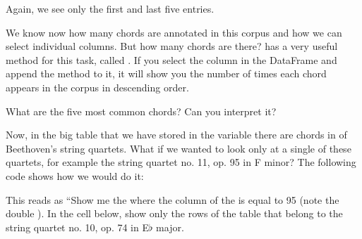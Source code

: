 \documentclass[letterpaper,10pt,english]{sphinxmanual}
\begin{document}
Again, we see only the first and last five entries.

We know now how many chords are annotated in this corpus and how we can select individual columns. But how many  chords are there?  has a very useful method for this task, called . If you select the  column in the DataFrame  and append the  method to it, it will show you the number of times each chord appears in the corpus in descending order.

{
\begin{sphinxVerbatim}[commandchars=\\\{\}]
\llap{\color{nbsphinxin}[ ]:\,\hspace{\fboxrule}\hspace{\fboxsep}}
\end{sphinxVerbatim}
}

What are the five most common chords? Can you interpret it?

Now, in the big table that we have stored in the variable  there are  chords in  of Beethoven’s string quartets. What if we wanted to look only at a single of these quartets, for example the string quartet no. 11, op. 95 in F minor? The following code shows how we would do it:

\begin{sphinxVerbatim}[commandchars=\\\{\}]
\PYG{p}{[} \PYG{p}{[}\PYG{p}{]}   \PYG{p}{]}
\end{sphinxVerbatim}

This reads as “Show me the  where the  column of the  is equal to 95 (note the double \sphinxcode{\sphinxupquote{==}}). In the cell below, show only the rows of the table that belong to the string quartet no. 10, op. 74 in E\(\flat\) major.

{
\begin{sphinxVerbatim}[commandchars=\\\{\}]
\llap{\color{nbsphinxin}[ ]:\,\hspace{\fboxrule}\hspace{\fboxsep}}
\end{sphinxVerbatim}
}
\end{document}
